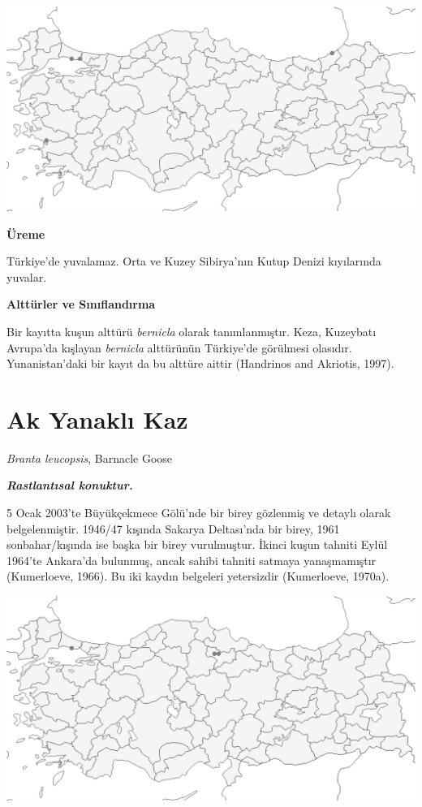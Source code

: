 \documentclass[
  a4paper,
  DIV=11,
  numbers=noendperiod]{scrartcl}
\begin{document}
\includegraphics{images/harita_Branta bernicla.png}

\textbf{Üreme}

Türkiye'de yuvalamaz. Orta ve Kuzey Sibirya'nın Kutup Denizi kıyılarında
yuvalar.

\textbf{Alttürler ve Sınıflandırma}

Bir kayıtta kuşun alttürü \emph{bernicla} olarak tanımlanmıştır. Keza,
Kuzeybatı Avrupa'da kışlayan \emph{bernicla} alttürünün Türkiye'de
görülmesi olasıdır. Yunanistan'daki bir kayıt da bu alttüre aittir
(Handrinos and Akriotis, 1997).

\section{Ak Yanaklı Kaz}\label{ak-yanaklux131-kaz}

\emph{Branta leucopsis}, Barnacle Goose

\textbf{\emph{Rastlantısal konuktur.}}

5 Ocak 2003'te Büyükçekmece Gölü'nde bir birey gözlenmiş ve detaylı
olarak belgelenmiştir. 1946/47 kışında Sakarya Deltası'nda bir birey,
1961 sonbahar/kışında ise başka bir birey vurulmuştur. İkinci kuşun
tahniti Eylül 1964'te Ankara'da bulunmuş, ancak sahibi tahniti satmaya
yanaşmamıştır (Kumerloeve, 1966). Bu iki kaydın belgeleri yetersizdir
(Kumerloeve, 1970a).

\includegraphics{images/harita_Branta leucopsis.png}
\end{document}
